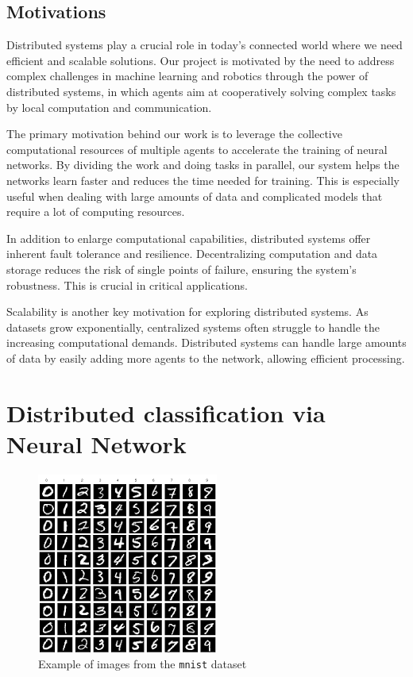 \documentclass[a4paper,11pt,oneside]{book}
\begin{document}
\tableofcontents \thispagestyle{empty}

\newpage
\section*{Motivations} 
Distributed systems play a crucial role in today's connected world where we need efficient and scalable solutions. Our project is motivated by the need to address complex challenges in machine learning and robotics through the power of distributed systems, in which agents aim at cooperatively solving complex tasks by local computation and communication.

\bigskip
The primary motivation behind our work is to leverage the collective computational resources of multiple agents to accelerate the training of neural networks. By dividing the work and doing tasks in parallel, our system helps the networks learn faster and reduces the time needed for training. This is especially useful when dealing with large amounts of data and complicated models that require a lot of computing resources.

In addition to enlarge computational capabilities, distributed systems offer inherent fault tolerance and resilience. Decentralizing computation and data storage reduces the risk of single points of failure, ensuring the system's robustness. This is crucial in critical applications.

Scalability is another key motivation for exploring distributed systems. As datasets grow exponentially, centralized systems often struggle to handle the increasing computational demands. Distributed systems can handle large amounts of data by easily adding more agents to the network, allowing efficient processing.




\chapter{Distributed classification via Neural Network}

\begin{figure}
	\centering
	\includegraphics[scale=0.5]{mnist}
	\caption{Example of images from the \texttt{mnist} dataset}
	\label{mnist}
\end{figure}
\end{document}
